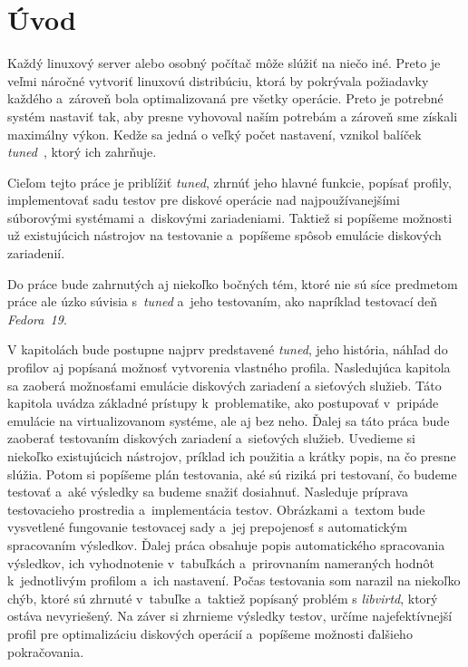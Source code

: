 %
%

\chapter{Úvod}

Každý linuxový server alebo osobný počítač môže slúžiť na niečo iné. Preto je
veľmi náročné vytvoriť linuxovú distribúciu, ktorá by pokrývala požiadavky
každého a~zároveň bola optimalizovaná pre všetky operácie. Preto je potrebné
systém nastaviť tak, aby presne vyhovoval naším potrebám a zároveň sme získali
maximálny výkon. Kedže sa jedná o veľký počet nastavení, vznikol balíček
\emph{tuned}~\cite{tunedHomepage}, ktorý ich zahrňuje.

Cieľom tejto práce je priblížiť \emph{tuned}, zhrnúť jeho hlavné funkcie,
popísať profily, implementovať sadu testov pre diskové operácie nad
najpoužívanejšími súborovými systémami a~diskovými zariadeniami. Taktiež si
popíšeme možnosti už existujúcich nástrojov na testovanie a~popíšeme spôsob
emulácie diskových zariadenií.

Do práce bude zahrnutých aj niekoľko bočných tém, ktoré nie sú síce predmetom
práce ale úzko súvisia s~\emph{tuned} a~jeho testovaním, ako napríklad
testovací deň \emph{Fedora~19}.

V kapitolách bude postupne najprv predstavené \emph{tuned}, jeho história,
náhľad do profilov aj popísaná možnosť vytvorenia vlastného profila.
Nasledujúca kapitola sa zaoberá možnosťami emulácie diskových zariadení a
sieťových služieb. Táto kapitola uvádza základné prístupy k~problematike, ako
postupovať v~pripáde emulácie na virtualizovanom systéme, ale aj bez neho.
Ďalej sa táto práca bude zaoberať testovaním diskových zariadení a~sieťových
služieb. Uvedieme si niekoľko existujúcich nástrojov, príklad ich použitia a
krátky popis, na čo presne slúžia. Potom si popíšeme plán testovania, aké sú
riziká pri testovaní, čo budeme testovať a~aké výsledky sa budeme snažiť
dosiahnuť. Nasleduje príprava testovacieho prostredia a~implementácia testov.
Obrázkami a~textom bude vysvetlené fungovanie testovacej sady a~jej prepojenosť
s automatickým spracovaním výsledkov. Ďalej práca obsahuje popis automatického
spracovania výsledkov, ich vyhodnotenie v~tabuľkách a~prirovnaním nameraných
hodnôt k~jednotlivým profilom a~ich nastavení. Počas testovania som narazil na
niekoľko chýb, ktoré sú zhrnuté v~tabuľke a~taktiež popísaný problém s
\emph{libvirtd}, ktorý ostáva nevyriešený. Na záver si zhrnieme výsledky
testov, určíme najefektívnejší profil pre optimalizáciu diskových operácií
a~popíšeme možnosti ďalšieho pokračovania.

